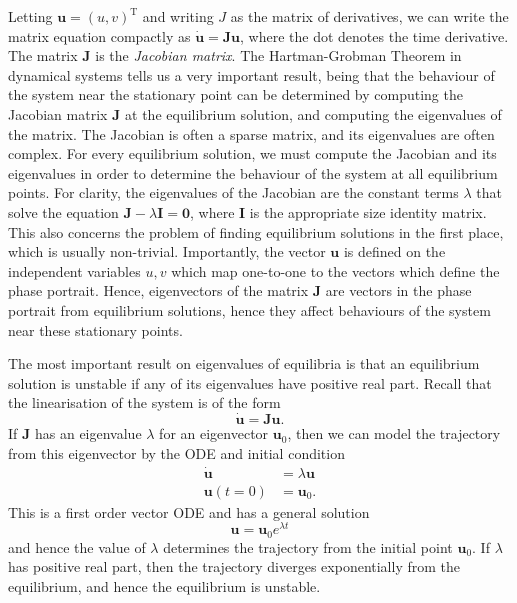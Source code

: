 \documentclass{report}
\begin{document}
Letting \(\mathbf{u} = (u,v)^\mathrm{T}\) and writing \(J\) as the matrix of derivatives,
we can write the matrix equation compactly as \( \dot{\mathbf{u}} = \mathbf{Ju}\), where the dot denotes the time derivative.
The matrix \(\mathbf{J}\) is the \textit{Jacobian matrix}.
The Hartman-Grobman Theorem in dynamical systems tells us a very important result,
being that the behaviour of the system near the stationary point can be determined by computing the Jacobian matrix \(\mathbf{J}\) at the equilibrium solution,
and computing the eigenvalues of the matrix.
The Jacobian is often a sparse matrix, and its eigenvalues are often complex.
For every equilibrium solution, we must compute the Jacobian and its eigenvalues in order to determine the behaviour of the system at all equilibrium points.
For clarity, the eigenvalues of the Jacobian are the constant terms \(\lambda\) that solve the equation \( \mathbf{J} -  \lambda \mathbf{I} = \mathbf{0}\),
where \(\mathbf{I}\) is the appropriate size identity matrix.
This also concerns the problem of finding equilibrium solutions in the first place, which is usually non-trivial.
Importantly, the vector $\mathbf{u}$ is defined on the independent variables $u,v$ which map one-to-one to the vectors which define the phase portrait.
Hence, eigenvectors of the matrix $\mathbf{J}$ are vectors in the phase portrait from equilibrium solutions,
hence they affect behaviours of the system near these stationary points.

The most important result on eigenvalues of equilibria is that an equilibrium solution is unstable if any of its eigenvalues have positive real part.
Recall that the linearisation of the system is of the form
\begin{equation}
	\dot{\mathbf{u}} = \mathbf{Ju}.
\end{equation}
If $\mathbf{J}$ has an eigenvalue $\lambda$ for an eigenvector $\mathbf{u}_0$,
then we can model the trajectory from this eigenvector by the ODE and initial condition
\begin{equation*}
	\begin{aligned}
		\dot{\mathbf{u}} &= \lambda \mathbf{u} \\
		\mathbf{u}(t=0) &= \mathbf{u}_0.
	\end{aligned}
\end{equation*}
This is a first order vector ODE and has a general solution
\begin{equation}
	\mathbf{u} = \mathbf{u}_0 e^{\lambda t}
\end{equation}
and hence the value of $\lambda$ determines the trajectory from the initial point $\mathbf{u}_0$.
If $\lambda$ has positive real part,
then the trajectory diverges exponentially from the equilibrium,
and hence the equilibrium is unstable.
\end{document}
